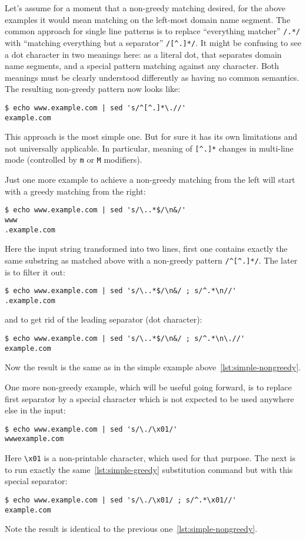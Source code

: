Let's assume for a moment that a non-greedy matching desired, for the above
examples it would mean matching on the left-most domain name segment.
The common approach for single line patterns is to replace
``everything matcher'' \lstinline{/.*/} with ``matching everything but
a separator'' \lstinline{/[^.]*/}. It might be confusing to see a dot
character in two meanings here: as a literal dot, that separates domain
name segments, and a special pattern matching against any character.
Both meanings must be clearly understood differently as having no common
semantics. The resulting non-greedy pattern now looks like:
\begin{lstlisting}[caption={Simple non-greedy matching}, label={lst:simple-nongreedy}]
$ echo www.example.com | sed 's/^[^.]*\.//'
example.com
\end{lstlisting}

This approach is the most simple one. But for sure it has its own limitations
and not universally applicable. In particular, meaning of \lstinline{[^.]*}
changes in multi-line mode (controlled by \lstinline{m} or \lstinline{M}
modifiers).

Just one more example to achieve a non-greedy matching from the left will start
with a greedy matching from the right:
\begin{lstlisting}
$ echo www.example.com | sed 's/\..*$/\n&/'
www
.example.com
\end{lstlisting}

Here the input string transformed into two lines, first one contains exactly
the same substring as matched above with a non-greedy pattern
\lstinline{/^[^.]*/}. The later is to filter it out:
\begin{lstlisting}
$ echo www.example.com | sed 's/\..*$/\n&/ ; s/^.*\n//'
.example.com
\end{lstlisting}
and to get rid of the leading separator (dot character):
\begin{lstlisting}
$ echo www.example.com | sed 's/\..*$/\n&/ ; s/^.*\n\.//'
example.com
\end{lstlisting}
Now the result is the same as in the simple example above~\ref{lst:simple-nongreedy}.

One more non-greedy example, which will be useful going forward, is to replace
first separator by a special character which is not expected to be used anywhere
else in the input:
\begin{lstlisting}
$ echo www.example.com | sed 's/\./\x01/'                
wwwexample.com
\end{lstlisting}
Here \lstinline{\x01} is a non-printable character, which used for that purpose.
The next is to run exactly the same~\ref{lst:simple-greedy} substitution command
but with this special separator:
\begin{lstlisting}
$ echo www.example.com | sed 's/\./\x01/ ; s/^.*\x01//'
example.com
\end{lstlisting}
Note the result is identical to the previous one~\ref{lst:simple-nongreedy}.


